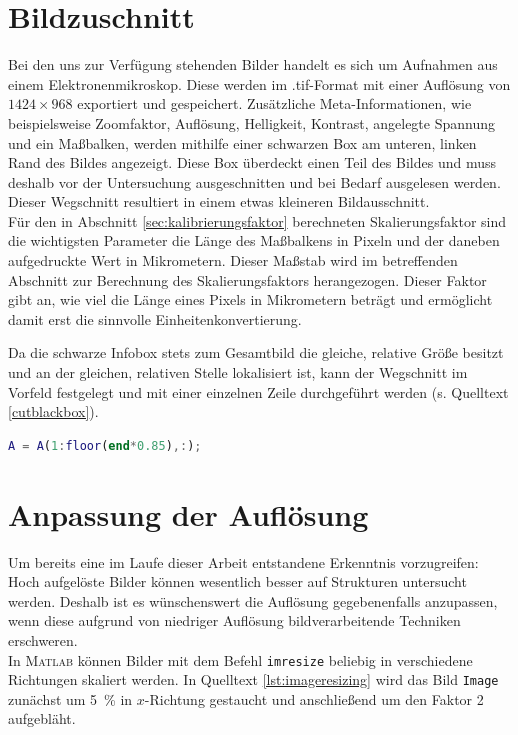 \documentclass[accentcolor=tud1c, 11pt, toc=bib, toc=listof, captions=abovetable, parskip=half]{tudreport}
\begin{document}
\section{Bildzuschnitt}
Bei den uns zur Verfügung stehenden Bilder handelt es sich um Aufnahmen aus einem Elektronenmikroskop. Diese werden im .tif-Format mit einer Auflösung von $1424\times968$ exportiert und gespeichert. Zusätzliche Meta-Informationen, wie beispielsweise Zoomfaktor, Auflösung, Helligkeit, Kontrast, angelegte Spannung und ein Maßbalken, werden mithilfe einer schwarzen Box am unteren, linken Rand des Bildes angezeigt. Diese Box überdeckt einen Teil des Bildes und muss deshalb vor der Untersuchung ausgeschnitten und bei Bedarf ausgelesen werden. Dieser Wegschnitt resultiert in einem etwas kleineren Bildausschnitt.\\

Für den in Abschnitt \ref{sec:kalibrierungsfaktor} berechneten Skalierungsfaktor sind die wichtigsten Parameter die Länge des Maßbalkens in Pixeln und der daneben aufgedruckte Wert in Mikrometern. Dieser Maßstab wird im betreffenden Abschnitt zur Berechnung des Skalierungsfaktors herangezogen. Dieser Faktor gibt an, wie viel die Länge eines Pixels in Mikrometern beträgt und ermöglicht damit erst die sinnvolle Einheitenkonvertierung.

Da die schwarze Infobox stets zum Gesamtbild die gleiche, relative Größe besitzt und an der gleichen, relativen Stelle lokalisiert ist, kann der Wegschnitt im Vorfeld festgelegt und mit einer einzelnen Zeile durchgeführt werden (s. Quelltext \ref{cutblackbox}).\\

\begin{lstlisting}[language=MATLAB, caption=Wegschnitt der schwarzen Infobox, label=cutblackbox]
A = A(1:floor(end*0.85),:);
\end{lstlisting}

\section{Anpassung der Auflösung}
Um bereits eine im Laufe dieser Arbeit entstandene Erkenntnis vorzugreifen: Hoch aufgelöste Bilder können wesentlich besser auf Strukturen untersucht werden. Deshalb ist es wünschenswert die Auflösung gegebenenfalls anzupassen, wenn diese aufgrund von niedriger Auflösung bildverarbeitende Techniken erschweren.\\
In \textsc{Matlab} können Bilder mit dem Befehl \lstinline|imresize| beliebig in verschiedene Richtungen skaliert werden. In Quelltext \ref{lst:imageresizing} wird das Bild \lstinline|Image| zunächst um \SI{5}{\percent} in $x$-Richtung gestaucht und anschließend um den Faktor 2 aufgebläht.\\
\end{document}
